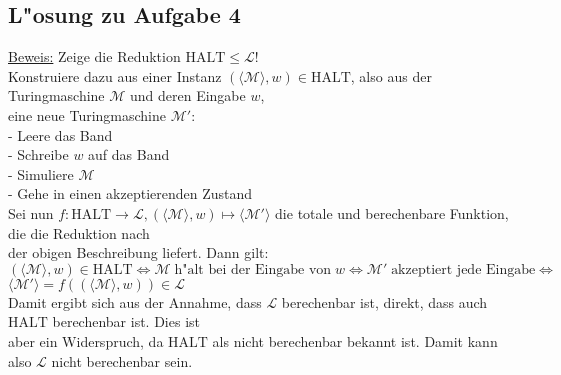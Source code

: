 \documentclass[10pt,oneside,onecolumn,a4paper,german,titlepage]{article}
\begin{document}
\subsection*{L"osung zu Aufgabe 4}
\underline{Beweis:} Zeige die Reduktion $\mbox{HALT} \leq \mathcal{L}$!\\
Konstruiere dazu aus einer Instanz $(\langle \mathcal{M} \rangle,w) \in \mbox{HALT}$,
also aus der Turingmaschine $\mathcal{M}$ und deren Eingabe $w$,\\
eine neue Turingmaschine $\mathcal{M}'$:\\
- Leere das Band\\
- Schreibe $w$ auf das Band\\
- Simuliere $\mathcal{M}$\\
- Gehe in einen akzeptierenden Zustand\\[4pt]
Sei nun $f: \mbox{HALT} \to \mathcal{L}, (\langle \mathcal{M} \rangle,w) \mapsto \langle \mathcal{M}' \rangle$ die totale und berechenbare Funktion, die die Reduktion nach\\
der obigen Beschreibung liefert. Dann gilt:\\[4pt]
$(\langle \mathcal{M} \rangle,w) \in \mbox{HALT} \Leftrightarrow \mathcal{M} \;
\mbox{h"alt bei der Eingabe von} \; w \Leftrightarrow \mathcal{M}' \;
\mbox{akzeptiert jede Eingabe} \Leftrightarrow$\\
$\langle\mathcal{M}' \rangle = f((\langle \mathcal{M} \rangle,w)) \in \mathcal{L}$\\[4pt]
Damit ergibt sich aus der Annahme, dass $\mathcal{L}$ berechenbar ist, direkt,
dass auch $\mbox{HALT}$ berechenbar ist. Dies ist\\
aber ein Widerspruch, da $\mbox{HALT}$ als nicht berechenbar bekannt ist. Damit
kann also $\mathcal{L}$ nicht berechenbar sein.
\end{document}
